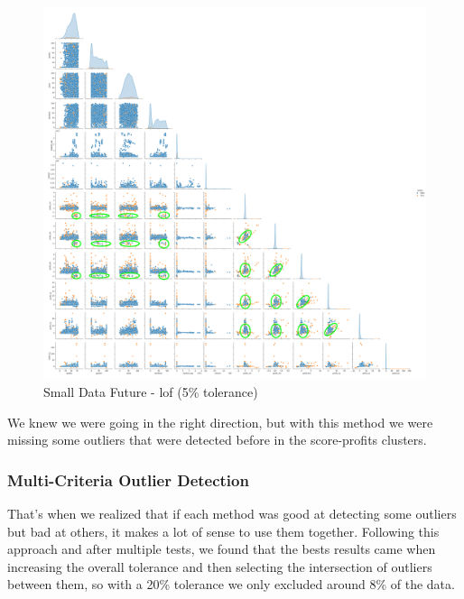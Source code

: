 \documentclass[11pt,english,a4paper,hidelinks]{book}
\begin{document}
\begin{figure}[H]
    \centering
    \includegraphics[width=1\textwidth]{images/code/outliers/Small Data future - LOF.png}
    \caption{Small Data Future - \acrshort{lof} (5\% tolerance)}
    \label{fig:small_data_future_lof}
\end{figure}

\noindent We knew we were going in the right direction, but with this method we were missing some outliers that were detected before in the score-profits clusters.

\newpage
\subsubsection{Multi-Criteria Outlier Detection}

That's when we realized that if each method was good at detecting some outliers but bad at others, it makes a lot of sense to use them together. Following this approach and after multiple tests, we found that the bests results came when increasing the overall tolerance and then selecting the intersection of outliers between them, so with a 20\% tolerance we only excluded around 8\% of the data.
\end{document}
